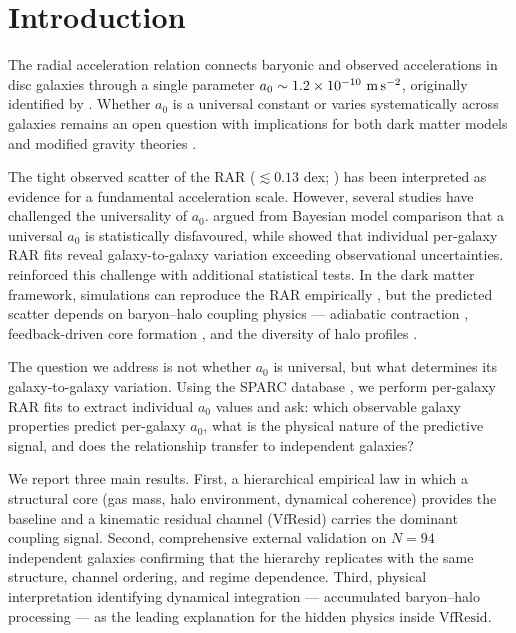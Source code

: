 \documentclass[fleqn,usenatbib]{mnras}
\newcommand{\azero}{a_0}
\newcommand{\vfresid}{\mathrm{VfResid}}
\begin{document}
\section{Introduction}
\label{sec:intro}

The radial acceleration relation \citep[RAR;][]{McGaugh2016} connects
baryonic and observed accelerations in disc galaxies through a single
parameter $\azero \sim 1.2 \times 10^{-10}~{\rm m\,s^{-2}}$, originally
identified by \citet{Milgrom1983}. Whether $\azero$ is a universal constant
or varies systematically across galaxies remains an open question with
implications for both dark matter models \citep{NFW1996, NFW1997} and
modified gravity theories \citep{Famaey2012}.

The tight observed scatter of the RAR ($\lesssim 0.13$ dex;
\citealt{Lelli2017}) has been interpreted as evidence for a fundamental
acceleration scale. However, several studies have challenged the universality
of $\azero$. \citet{Rodrigues2018} argued from Bayesian model comparison
that a universal $\azero$ is statistically disfavoured, while
\citet{Li2018} showed that individual per-galaxy RAR fits reveal
galaxy-to-galaxy variation exceeding observational uncertainties.
\citet{Marra2020} reinforced this challenge with additional statistical
tests. In the dark matter framework, simulations can reproduce the RAR
empirically \citep{Ludlow2017, Navarro2017}, but the predicted scatter
depends on baryon--halo coupling physics --- adiabatic contraction
\citep{Blumenthal1986}, feedback-driven core formation
\citep{DiCintio2014}, and the diversity of halo profiles
\citep{Oman2015, Santos-Santos2020}.

The question we address is not whether $\azero$ is universal, but what
determines its galaxy-to-galaxy variation. Using the SPARC database
\citep{Lelli2016a}, we perform per-galaxy RAR fits to extract individual
$\azero$ values and ask: which observable galaxy properties predict
per-galaxy $\azero$, what is the physical nature of the predictive signal,
and does the relationship transfer to independent galaxies?

We report three main results. First, a hierarchical empirical law in which
a structural core (gas mass, halo environment, dynamical coherence)
provides the baseline and a kinematic residual channel ($\vfresid$)
carries the dominant coupling signal. Second, comprehensive external
validation on $N = 94$ independent galaxies confirming that the hierarchy
replicates with the same structure, channel ordering, and regime dependence.
Third, physical interpretation identifying dynamical integration ---
accumulated baryon--halo processing --- as the leading explanation for the
hidden physics inside $\vfresid$.
\end{document}
